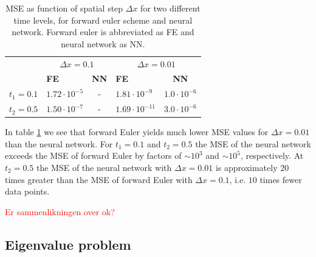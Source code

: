 \documentclass[12pt]{extarticle}
\begin{document}
\begin{table}[h]
	\centering
	\begin{tabular}{l|cc|cc|}
		\cline{2-5}
		& \multicolumn{2}{c|}{\textbf{$\Delta x=0.1$}}           & \multicolumn{2}{c|}{\textbf{$\Delta x=0.01$}}           \\ \cline{2-5} 
		& \multicolumn{1}{l|}{\textbf{FE}}         & \textbf{NN} & \multicolumn{1}{l|}{\textbf{FE}}          & \textbf{NN} \\ \hline
		\multicolumn{1}{|l|}{\textbf{$t_1=0.1$}} & \multicolumn{1}{l|}{$1.72\cdot 10^{-5}$} & -            & \multicolumn{1}{l|}{$1.81\cdot 10^{-9}$}  & $1.0\cdot10^{-6}$            \\ \hline
		\multicolumn{1}{|l|}{\textbf{$t_2=0.5$}} & \multicolumn{1}{l|}{$1.50\cdot 10^{-7}$} & -            & \multicolumn{1}{l|}{$1.69\cdot 10^{-11}$} & $3.0\cdot10^{-6}$             \\ \hline
	\end{tabular}
\caption{MSE as function of spatial step $\Delta x$ for two different time levels, for forward euler scheme and neural network. Forward euler is abbreviated as FE and neural network as NN.}
\label{tab:MSE_compare}
\end{table}

In table \ref{tab:MSE_compare} we see that forward Euler yields much lower MSE values for $\Delta x = 0.01$ than the neural network. For $t_1=0.1$ and $t_2=0.5$ the MSE of the neural network exceeds the MSE of forward Euler by factors of $\sim10^3$ and $\sim10^5$, respectively. At $t_2=0.5$ the MSE of the neural network with $\Delta x = 0.01$ is approximately $20$ times greater than the MSE of forward Euler with $\Delta x=0.1$, i.e. $10$ times fewer data points. 

\textcolor{red}{Er sammenlikningen over ok?}

\subsection{Eigenvalue problem}
\end{document}
